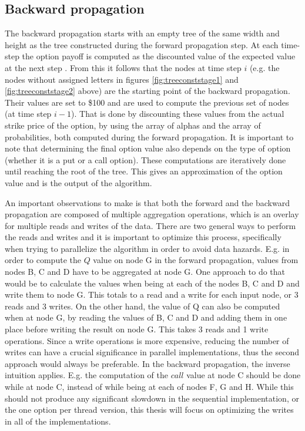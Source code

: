 \subsection{Backward propagation}
The backward propagation starts with an empty tree of the same width and height as the tree constructed during the forward propagation step. At each time-step the option payoff is computed as the discounted value of the expected value at the next step \cite[pg. 6]{uhwirt}. From this it follows that the nodes at time step $i$ (e.g. the nodes without assigned letters in figures \ref{fig:treeconststage1} and \ref{fig:treeconststage2} above) are the starting point of the backward propagation. Their values are set to \$100 and are used to compute the previous set of nodes (at time step $i-1$). That is done by discounting these values from the actual strike price of the option, by using the array of alphas and the array of probabilities, both computed during the forward propagation. It is important to note that determining the final option value also depends on the type of option (whether it is a put or a call option). These computations are iteratively done until reaching the root of the tree. This gives an approximation of the option value and is the output of the algorithm. 

An important observations to make is that both the forward and the backward propagation are composed of multiple aggregation operations, which is an overlay for multiple reads and writes of the data. There are two general ways to perform the reads and writes and it is important to optimize this process, specifically when trying to parallelize the algorithm in order to avoid data hazards. E.g. in order to compute the $Q$ value on node G in the forward propagation, values from nodes B, C and D have to be aggregated at node G. One approach to do that would be to calculate the values when being at each of the nodes B, C and D and write them to node G. This totals to a read and a write for each input node, or 3 reads and 3 writes. On the other hand, the value of Q can also be computed when at node G, by reading the values of B, C and D and adding them in one place before writing the result on node G. This takes 3 reads and 1 write operations. Since a write operations is more expensive, reducing the number of writes can have a crucial significance in parallel implementations, thus the second approach would always be preferable. In the backward propagation, the inverse intuition applies. E.g. the computation of the $call$ value at node C should be done while at node C, instead of while being at each of nodes F, G and H. While this should not produce any significant slowdown in the sequential implementation, or the one option per thread version, this thesis will focus on optimizing the writes in all of the implementations.

